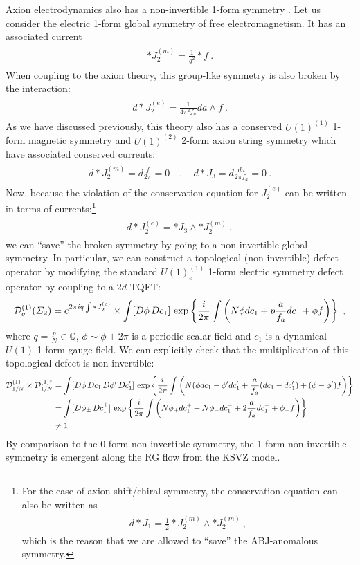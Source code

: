 \documentclass[11pt]{article}
\newcommand{\eq}[1]{\begin{align}\begin{split}#1\end{split}\end{align}}
\def\half{\frac{1}{2}}
\def\CD {{\cal D}}
\def\IQ{\mathbb{Q}}
\begin{document}
Axion electrodynamics also has a non-invertible 1-form symmetry \cite{Choi:2022fgx}. Let us consider the electric 1-form global symmetry of free electromagnetism. It has an associated current 
\eq{
\ast J_2^{(m)}=\frac{1}{g^2}\ast f~. 
}
When coupling to the axion theory, this group-like symmetry is also broken by the interaction:
\eq{
d\ast J_2^{(e)}=\frac{1}{4\pi^2 f_a}da\wedge f~.
}
As we have discussed previously, this theory also has a conserved $U(1)^{(1)}$ 1-form magnetic symmetry and $U(1)^{(2)}$ 2-form axion string symmetry which have associated conserved currents:
\eq{
d\ast J_2^{(m)}=d\frac{f}{2\pi}=0\quad, \quad d\ast J_3=d\frac{da}{2\pi f_a}=0~.
}
Now, because the violation of the conservation equation for $J_2^{(e)}$ can be written in terms of currents:\footnote{For the case of axion shift/chiral symmetry, the conservation equation can also be written as 
\eq{
d\ast J_1=\half \ast J_2^{(m)}\wedge \ast J_2^{(m)}~,
} which is the reason that we are allowed to ``save'' the ABJ-anomalous symmetry. }
\eq{
d\ast J_2^{(e)}=\ast J_3\wedge \ast J_2^{(m)}~, 
}
we can ``save'' the broken symmetry by going to a non-invertible global symmetry. In particular, we can construct a topological (non-invertible) defect operator by modifying the standard $U(1)^{(1)}_e$ 1-form electric symmetry defect operator by coupling to a $2d$ TQFT:
\eq{
\CD^{(1)}_q(\Sigma_2)=e^{ 2\pi i q \int \ast J_2^{(e)}}\times \int [D\phi\,Dc_1] ~{\rm exp}\left\{ \frac{i}{2\pi} \int \left(N \phi dc_1+ p\frac{a}{f_a}dc_1+\phi f\right)\right\}~, 
}
where $q=\frac{p}{N}\in \IQ$, $\phi\sim \phi+2\pi$ is a periodic scalar field and $c_1$ is a dynamical $U(1)$ 1-form gauge field. We can explicitly check that the multiplication of this topological defect is non-invertible:
\eq{
\CD^{(1)}_{1/N}\times \CD^{(1)\dagger}_{1/N}&=\int [D\phi\,Dc_1\,D\phi^\prime\, Dc_1^\prime] ~{\rm exp}\left\{ \frac{i}{2\pi} \int \left(N (\phi dc_1-\phi^\prime dc_1^\prime+ \frac{a}{f_a}(dc_1-dc_1^\prime)+(\phi-\phi^\prime)f\right)\right\}\\
&= \int [D\phi_\pm\,Dc_1^\pm]~{\rm exp}\left\{\frac{i}{2\pi}\int \left(N\phi_+dc_1^+ +N\phi_-dc_1^-+2\frac{a}{f_a}dc_1^-+\phi_- f
\right)\right\}\\
&\neq 1
} 
By comparison to the 0-form non-invertible symmetry, the 1-form non-invertible symmetry is emergent along the RG flow from the KSVZ model. 
\end{document}
